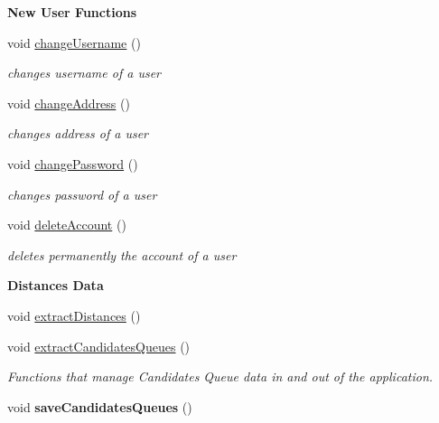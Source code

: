 \begin{Indent}\textbf{ New User Functions}\par
\begin{DoxyCompactItemize}
\item 
void \hyperlink{class_agency_a8a2b0d746484213d43f722c0a0766a66}{change\+Username} ()
\begin{DoxyCompactList}\small\item\em changes username of a user \end{DoxyCompactList}\item 
\mbox{\label{class_agency_a9902ae22a9a351479e2b017bc7d32d37}} 
void \hyperlink{class_agency_a9902ae22a9a351479e2b017bc7d32d37}{change\+Address} ()
\begin{DoxyCompactList}\small\item\em changes address of a user \end{DoxyCompactList}\item 
\mbox{\label{class_agency_a580f891506db1463b17f1076ccadfe4c}} 
void \hyperlink{class_agency_a580f891506db1463b17f1076ccadfe4c}{change\+Password} ()
\begin{DoxyCompactList}\small\item\em changes password of a user \end{DoxyCompactList}\item 
\mbox{\label{class_agency_a90711f8b569ac19ce052b59e79848df5}} 
void \hyperlink{class_agency_a90711f8b569ac19ce052b59e79848df5}{delete\+Account} ()
\begin{DoxyCompactList}\small\item\em deletes permanently the account of a user \end{DoxyCompactList}\end{DoxyCompactItemize}
\end{Indent}
\begin{Indent}\textbf{ Distances Data}\par
\begin{DoxyCompactItemize}
\item 
void \hyperlink{class_agency_ab893f05c69379631019010af71052595}{extract\+Distances} ()
\item 
\mbox{\label{class_agency_af587ae52b7b80696bbc7bba02b8238af}} 
void \hyperlink{class_agency_af587ae52b7b80696bbc7bba02b8238af}{extract\+Candidates\+Queues} ()
\begin{DoxyCompactList}\small\item\em Functions that manage Candidates Queue data in and out of the application. \end{DoxyCompactList}\item 
\mbox{\label{class_agency_a75cbaedb476597df320ed4e53b278f84}} 
void {\bfseries save\+Candidates\+Queues} ()
\end{DoxyCompactItemize}
\end{Indent}
